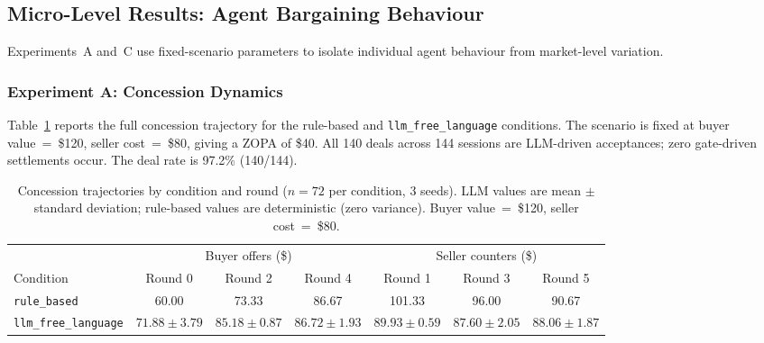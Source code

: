 
\subsection{Micro-Level Results: Agent Bargaining Behaviour}
\label{sec:results-micro}

Experiments~A and~C use fixed-scenario parameters to isolate individual agent behaviour from market-level variation.

\subsubsection{Experiment A: Concession Dynamics}
\label{sec:results-concession}

Table~\ref{tab:concession} reports the full concession trajectory for the rule-based and \texttt{llm\_free\_language} conditions.  The scenario is fixed at buyer value~=~\$120, seller cost~=~\$80, giving a ZOPA of \$40.  All 140 deals across 144 sessions are LLM-driven acceptances; zero gate-driven settlements occur.  The deal rate is 97.2\% (140/144).

\begin{table}[ht]
\centering
\caption{Concession trajectories by condition and round ($n = 72$ per condition, 3 seeds).  LLM values are mean $\pm$ standard deviation; rule-based values are deterministic (zero variance).  Buyer value~=~\$120, seller cost~=~\$80.}
\label{tab:concession}
\begin{tabular}{@{}lcccccc@{}}
\toprule
 & \multicolumn{3}{c}{Buyer offers (\$)} & \multicolumn{3}{c}{Seller counters (\$)} \\
\cmidrule(lr){2-4}\cmidrule(lr){5-7}
Condition & Round 0 & Round 2 & Round 4 & Round 1 & Round 3 & Round 5 \\
\midrule
\texttt{rule\_based}       & 60.00 & 73.33 & 86.67 & 101.33 & 96.00 & 90.67 \\
\texttt{llm\_free\_language} & $71.88 \pm 3.79$ & $85.18 \pm 0.87$ & $86.72 \pm 1.93$ & $89.93 \pm 0.59$ & $87.60 \pm 2.05$ & $88.06 \pm 1.87$ \\
\bottomrule
\end{tabular}
\end{table}


